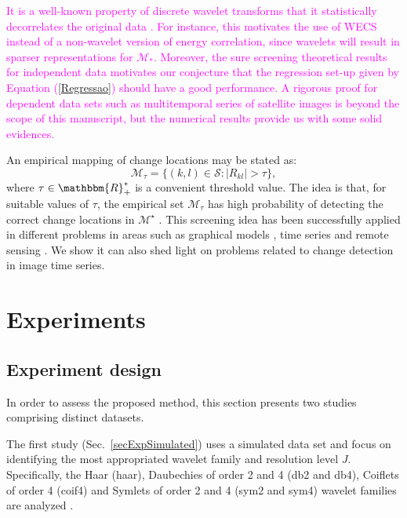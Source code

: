 \documentclass[journal]{IEEEtran}
\begin{document}
\textcolor{magenta}{
It is a well-known property of discrete wavelet transforms that it statistically decorrelates the original data \cite{vidakovic1999statistical,morettin2017wavelets}. For instance, this motivates the use of WECS instead of a non-wavelet version of energy correlation, since wavelets will result in sparser representations for $\mathcal{M}_*$. Moreover, the sure screening theoretical results for independent data motivates our conjecture that the regression set-up given by Equation (\ref{Regressao}) should have a good performance. A rigorous proof for dependent data sets such as multitemporal series of satellite images is beyond the scope of this manuscript, but the numerical results provide us with some solid evidences.
}

An empirical mapping of change locations may be stated as:
\begin{equation}
\mathcal{M}_{\tau} = \{(k,l) \in \mathcal{S} : |R_{kl}|>\tau\},
\label{E:def_Mtaud}
\end{equation}
where $\tau \in \mathbbm{R}_{+}^{*}$ is a convenient threshold value. The idea is that, for suitable values of $\tau$, the empirical set $\mathcal{M}_{\tau}$ has high probability of detecting the correct change locations in $\mathcal{M}^{\star}$ \cite{fan2020statistical}. This screening idea has been successfully applied in different problems in areas such as graphical models \cite{zheng2020uniform}, time series \cite{yousuf2021targeting} and remote sensing \cite{li2021mapping}. We show it can also shed light on problems related to change detection in image time series.




\section{Experiments}\label{secExperiments}

\subsection{Experiment design}\label{secExpDesign}

In order to assess the proposed method, this section presents two studies comprising distinct datasets.

The first study (Sec.~\ref{secExpSimulated}) uses a simulated data set and focus on identifying the most appropriated wavelet family and resolution level $J$. Specifically, the Haar (haar), Daubechies of order 2 and 4 (db2 and db4), Coiflets of order 4 (coif4) and Symlets of order 2 and 4 (sym2 and sym4) wavelet families are analyzed \cite{BeylkinEA1991,Daubechies1992}. 
\end{document}
